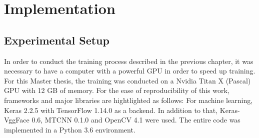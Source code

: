 \chapter{Implementation}
\section{Experimental Setup}
In order to conduct the training process described in the previous chapter, it was necessary to have a computer with a powerful GPU in order to speed up training. For this Master thesis, the training was conducted on a Nvidia Titan X (Pascal) GPU with 12 GB of memory. 
\newline\newline
For the ease of reproducibility of this work, frameworks and major libraries are hightlighted as follows: For machine learning, Keras 2.2.5 with TensorFlow 1.14.0 as a backend. In addition to that, Keras-VggFace 0.6, MTCNN 0.1.0 and OpenCV 4.1 were used. The entire code was implemented in a Python 3.6 environment.


